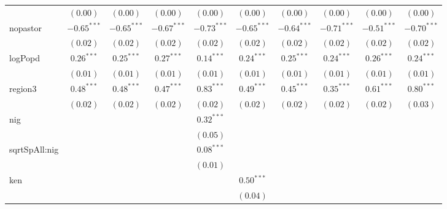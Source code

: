\begin{sidewaystable}
\begin{center}
{\begin{tabular}{l c c c c c c c c c}
                  & $(0.00)$      & $(0.00)$      & $(0.00)$      & $(0.00)$      & $(0.00)$      & $(0.00)$        & $(0.00)$      & $(0.00)$      & $(0.00)$      \\
nopastor          & $-0.65^{***}$ & $-0.65^{***}$ & $-0.67^{***}$ & $-0.73^{***}$ & $-0.65^{***}$ & $-0.64^{***}$   & $-0.71^{***}$ & $-0.51^{***}$ & $-0.70^{***}$ \\
                  & $(0.02)$      & $(0.02)$      & $(0.02)$      & $(0.02)$      & $(0.02)$      & $(0.02)$        & $(0.02)$      & $(0.02)$      & $(0.02)$      \\
logPopd           & $0.26^{***}$  & $0.25^{***}$  & $0.27^{***}$  & $0.14^{***}$  & $0.24^{***}$  & $0.25^{***}$    & $0.24^{***}$  & $0.26^{***}$  & $0.24^{***}$  \\
                  & $(0.01)$      & $(0.01)$      & $(0.01)$      & $(0.01)$      & $(0.01)$      & $(0.01)$        & $(0.01)$      & $(0.01)$      & $(0.01)$      \\
region3           & $0.48^{***}$  & $0.48^{***}$  & $0.47^{***}$  & $0.83^{***}$  & $0.49^{***}$  & $0.45^{***}$    & $0.35^{***}$  & $0.61^{***}$  & $0.80^{***}$  \\
                  & $(0.02)$      & $(0.02)$      & $(0.02)$      & $(0.02)$      & $(0.02)$      & $(0.02)$        & $(0.02)$      & $(0.02)$      & $(0.03)$      \\
nig               &               &               &               & $0.32^{***}$  &               &                 &               &               &               \\
                  &               &               &               & $(0.05)$      &               &                 &               &               &               \\
sqrtSpAll:nig     &               &               &               & $0.08^{***}$  &               &                 &               &               &               \\
                  &               &               &               & $(0.01)$      &               &                 &               &               &               \\
ken               &               &               &               &               & $0.50^{***}$  &                 &               &               &               \\
                  &               &               &               &               & $(0.04)$      &                 &               &               &               \\

\end{tabular}}
\end{center}
\end{sidewaystable}
